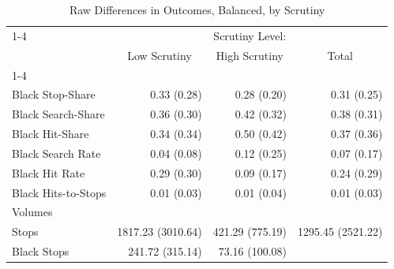 \begin{table}[!h]
\caption{Raw Differences in Outcomes, Balanced, by Scrutiny}
\centering
\begin{tabular}{llll}
\cline{1-4}
\multicolumn{1}{r}{} &
  \multicolumn{3}{c}{Scrutiny Level:} \\
\multicolumn{1}{r}{} &
  \multicolumn{1}{c}{Low Scrutiny} &
  \multicolumn{1}{c}{High Scrutiny} &
  \multicolumn{1}{c}{Total} \\
\cline{1-4}
\multicolumn{1}{l}{Rates} &
  \multicolumn{1}{r}{} &
  \multicolumn{1}{r}{} &
  \multicolumn{1}{r}{} \\
\multicolumn{1}{l}{\hspace{1em}Black Stop-Share} &
  \multicolumn{1}{r}{0.33 (0.28)} &
  \multicolumn{1}{r}{0.28 (0.20)} &
  \multicolumn{1}{r}{0.31 (0.25)} \\
\multicolumn{1}{l}{\hspace{1em}Black Search-Share} &
  \multicolumn{1}{r}{0.36 (0.30)} &
  \multicolumn{1}{r}{0.42 (0.32)} &
  \multicolumn{1}{r}{0.38 (0.31)} \\
\multicolumn{1}{l}{\hspace{1em}Black Hit-Share} &
  \multicolumn{1}{r}{0.34 (0.34)} &
  \multicolumn{1}{r}{0.50 (0.42)} &
  \multicolumn{1}{r}{0.37 (0.36)} \\
\multicolumn{1}{l}{\hspace{1em}Black Search Rate} &
  \multicolumn{1}{r}{0.04 (0.08)} &
  \multicolumn{1}{r}{0.12 (0.25)} &
  \multicolumn{1}{r}{0.07 (0.17)} \\
\multicolumn{1}{l}{\hspace{1em}Black Hit Rate} &
  \multicolumn{1}{r}{0.29 (0.30)} &
  \multicolumn{1}{r}{0.09 (0.17)} &
  \multicolumn{1}{r}{0.24 (0.29)} \\
\multicolumn{1}{l}{\hspace{1em}Black Hits-to-Stops} &
  \multicolumn{1}{r}{0.01 (0.03)} &
  \multicolumn{1}{r}{0.01 (0.04)} &
  \multicolumn{1}{r}{0.01 (0.03)} \\
\multicolumn{1}{l}{Volumes} &
  \multicolumn{1}{r}{} &
  \multicolumn{1}{r}{} &
  \multicolumn{1}{r}{} \\
\multicolumn{1}{l}{\hspace{1em}Stops} &
  \multicolumn{1}{r}{1817.23 (3010.64)} &
  \multicolumn{1}{r}{421.29 (775.19)} &
  \multicolumn{1}{r}{1295.45 (2521.22)} \\
\multicolumn{1}{l}{\hspace{1em}Black Stops} &
  \multicolumn{1}{r}{241.72 (315.14)} &
  \multicolumn{1}{r}{73.16 (100.08)} &

\end{tabular}
\end{table}
